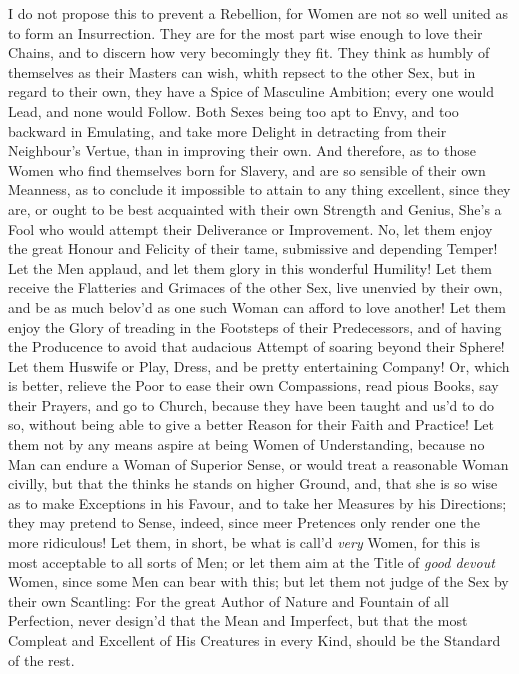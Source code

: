 I do not propose this to prevent a Rebellion, for Women are not so
well united as to form an Insurrection. They are for the most part
wise enough to love their Chains, and to discern how very becomingly
they fit. They think as humbly of themselves as their Masters can
wish, whith repsect to the other Sex, but in regard to their own, they
have a Spice of Masculine Ambition; every one would Lead, and none
would Follow. Both Sexes being too apt to Envy, and too backward in
Emulating, and take more Delight in detracting from their Neighbour's
Vertue, than in improving their own. And therefore, as to those Women
who find themselves born for Slavery, and are so sensible of their own
 Meanness, as to conclude it impossible to attain to any
thing excellent, since they are, or ought to be best acquainted with
their own Strength and Genius, She's a Fool who would attempt their
Deliverance or Improvement. No, let them enjoy the great Honour and
Felicity of their tame, submissive and depending Temper! Let the Men
applaud, and let them glory in this wonderful Humility! Let them
receive the Flatteries and Grimaces of the other Sex, live unenvied by
their own, and be as much belov'd as one such Woman can afford to love
another! Let them enjoy the Glory of treading in the Footsteps of
their Predecessors, and of having the Producence to avoid that
audacious Attempt of soaring beyond their Sphere! Let them Huswife or
Play, Dress, and be pretty entertaining Company! Or, which is better,
relieve the Poor to ease their own Compassions, read pious Books, say
their Prayers, and go to Church, because they have been taught and
us'd to do so,  without being able to give a better Reason
for their Faith and Practice! Let them not by any means aspire at
being Women of Understanding, because no Man can endure a Woman of
Superior Sense, or would treat a reasonable Woman civilly, but that
the thinks he stands on higher Ground, and, that she is so wise as to
make Exceptions in his Favour, and to take her Measures by his
Directions; they may pretend to Sense, indeed, since meer Pretences
only render one the more ridiculous! Let them, in short, be what is
call'd \textit{very} Women, for this is most acceptable to all sorts
of Men; or let them aim at the Title of \textit{good devout} Women,
since some Men can bear with this; but let them not judge of the Sex
by their own Scantling: For the great Author of Nature and Fountain of
all Perfection, never design'd that the Mean and Imperfect, but that
the most Compleat and Excellent of His Creatures in every Kind, should
be the Standard of the rest.

